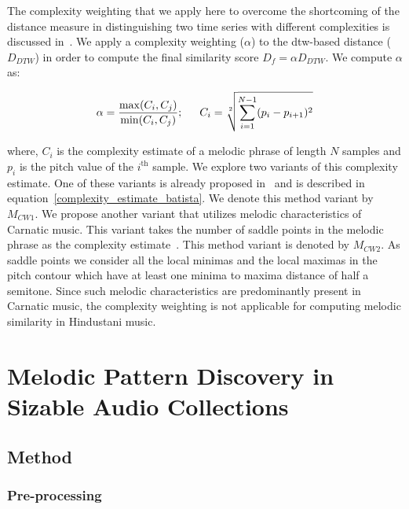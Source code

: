 The complexity weighting that we apply here to overcome the shortcoming of the distance measure in distinguishing two time series with different complexities is discussed in~\cite{batista2011complexity}. We apply a complexity weighting ($\alpha$) to the \gls{dtw}-based distance ($D_{DTW}$) in order to compute the final similarity score $D_{f}=\alpha D_{DTW}$. We compute $\alpha$ as:


\begin{equation}
\begin{gathered}
\alpha = \frac{\max(C_i,C_j)}{\min(C_i, C_j)};\hspace{1.5em} C_i = \sqrt[2]{\sum_{i=1}^{N-1} (p_{i}-p_{i+1})^2}\\
\end{gathered}
\label{complexity_estimate_batista}
\end{equation}

\noindent where, $C_i$ is the complexity estimate of a melodic phrase of length $N$ samples and $p_i$ is the pitch value of the $i^{\mathrm{th}}$ sample. We explore two variants of this complexity estimate. One of these variants is already proposed in~\cite{batista2011complexity} and is described in equation~\ref{complexity_estimate_batista}. We denote this method variant by $M_{CW1}$. We propose another variant that utilizes melodic characteristics of Carnatic music. This variant takes the number of saddle points in the melodic phrase as the complexity estimate~\cite{Ishwar2013}. This method variant is denoted by $M_{CW2}$. As saddle points we consider all the local minimas and the local maximas in the pitch contour which have at least one minima to maxima distance of half a semitone. Since such melodic characteristics are predominantly present in Carnatic music, the complexity weighting is not applicable for computing melodic similarity in Hindustani music.


\section{Melodic Pattern Discovery in Sizable Audio Collections}
\label{sec:patterns_melodic_pattern_discovery}

\subsection{Method}


\subsubsection{Pre-processing}
\label{sec:preprocessing}

